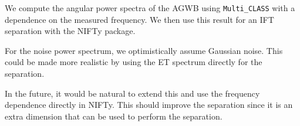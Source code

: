 We compute the angular power spectra of the AGWB using {\tt Multi\_CLASS} with a dependence on the measured frequency. We then use this result for an IFT separation with the NIFTy package. 

For the noise power spectrum, we optimistically assume Gaussian noise. This could be made more realistic by using the ET spectrum directly for the separation. 

In the future, it would be natural to extend this and use the frequency dependence directly in NIFTy. This should improve the separation since it is an extra dimension that can be used to perform the separation.